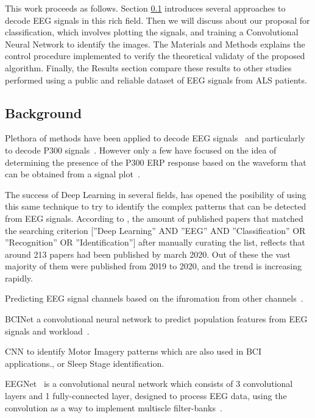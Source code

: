 \documentclass[conference]{IEEEtran}
\begin{document}
This work proceeds as follows.  Section \ref{background} introduces several approaches to decode EEG signals in this rich field.  Then we will discuss about our proposal for classification, which involves plotting the signals, and training a Convolutional Neural Network to identify the images.  The Materials and Methods explains the control procedure implemented to verify the theoretical validaty of the proposed algorithm. Finally, the Results section compare these results to other studies performed using a public and reliable dataset of EEG signals from ALS patients. 

\subsection{Background}
\label{background}

Plethora of methods have been applied to decode EEG signals~\cite{Orhanbulucu.etal2022,Avola.etal2022} and particularly to decode P300 signals~\cite{Jiannan.etal2021}.  However only a few have focused on the idea of determining the presence of the P300 ERP response based on the waveform that can be obtained from a signal plot~\cite{Ramele2018EEGWA}.

The success of Deep Learning in several fields\cite{Sarker.2021}, has opened the posibility of using this same technique to try to identify the complex patterns that can be detected from EEG signals.  According to \cite{dnn10years}, the amount of published papers that matched the searching criterion  [”Deep Learning” AND ”EEG” AND ”Classification” OR ”Recognition” OR ”Identification”] after manually curating the list, reflects that around 213 papers had been published by march 2020. Out of these the vast majority of them were published from 2019 to 2020, and the trend is increasing rapidly. 

Predicting EEG signal channels based on the ifnromation from other channels~\cite{Avijit.2020}.

BCINet a convolutional neural network to predict population features from EEG signals and workload~\cite{Singh.etal2020}.

CNN to identify Motor Imagery patterns which are also used in BCI applications.\cite{Tabar.2016}, or Sleep Stage identification\cite{Cai.etal2021}.

EEGNet~\cite{Lawhern.2018} is a convolutional neural network which consists of 3 convolutional layers and 1 fully-connected layer, designed to process EEG data, using the convolution as a way to implement multiscle filter-banks~\cite{Zhu.etal2022}.
\end{document}
